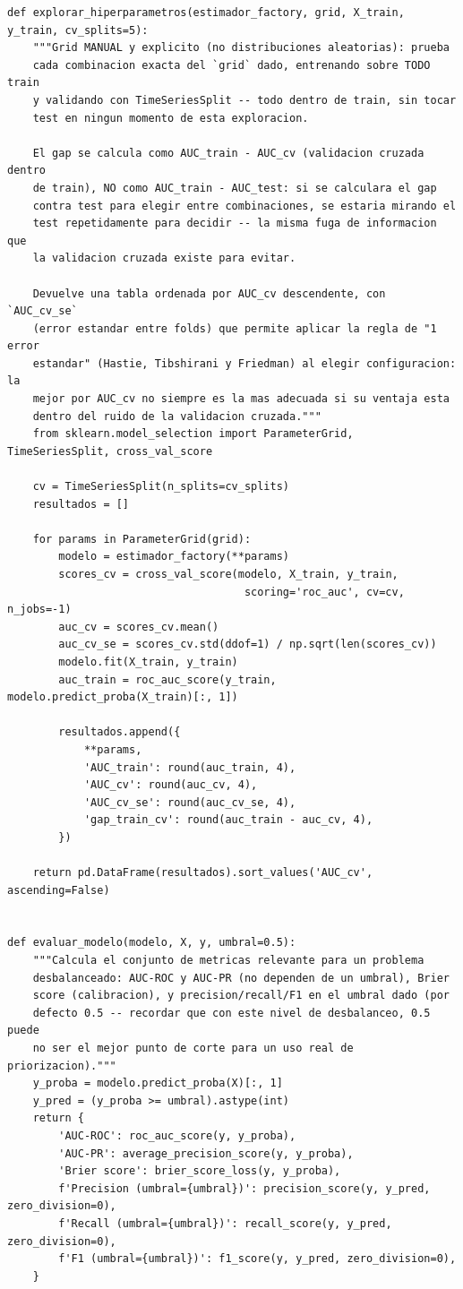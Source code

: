\documentclass[11pt,a4paper]{article}
\begin{document}
\begin{lstlisting}[caption={Exploración manual de una rejilla de hiperparámetros, con validación temporal dentro de entrenamiento.}]
def explorar_hiperparametros(estimador_factory, grid, X_train, y_train, cv_splits=5):
    """Grid MANUAL y explicito (no distribuciones aleatorias): prueba
    cada combinacion exacta del `grid` dado, entrenando sobre TODO train
    y validando con TimeSeriesSplit -- todo dentro de train, sin tocar
    test en ningun momento de esta exploracion.

    El gap se calcula como AUC_train - AUC_cv (validacion cruzada dentro
    de train), NO como AUC_train - AUC_test: si se calculara el gap
    contra test para elegir entre combinaciones, se estaria mirando el
    test repetidamente para decidir -- la misma fuga de informacion que
    la validacion cruzada existe para evitar.

    Devuelve una tabla ordenada por AUC_cv descendente, con `AUC_cv_se`
    (error estandar entre folds) que permite aplicar la regla de "1 error
    estandar" (Hastie, Tibshirani y Friedman) al elegir configuracion: la
    mejor por AUC_cv no siempre es la mas adecuada si su ventaja esta
    dentro del ruido de la validacion cruzada."""
    from sklearn.model_selection import ParameterGrid, TimeSeriesSplit, cross_val_score

    cv = TimeSeriesSplit(n_splits=cv_splits)
    resultados = []

    for params in ParameterGrid(grid):
        modelo = estimador_factory(**params)
        scores_cv = cross_val_score(modelo, X_train, y_train,
                                     scoring='roc_auc', cv=cv, n_jobs=-1)
        auc_cv = scores_cv.mean()
        auc_cv_se = scores_cv.std(ddof=1) / np.sqrt(len(scores_cv))
        modelo.fit(X_train, y_train)
        auc_train = roc_auc_score(y_train, modelo.predict_proba(X_train)[:, 1])

        resultados.append({
            **params,
            'AUC_train': round(auc_train, 4),
            'AUC_cv': round(auc_cv, 4),
            'AUC_cv_se': round(auc_cv_se, 4),
            'gap_train_cv': round(auc_train - auc_cv, 4),
        })

    return pd.DataFrame(resultados).sort_values('AUC_cv', ascending=False)


def evaluar_modelo(modelo, X, y, umbral=0.5):
    """Calcula el conjunto de metricas relevante para un problema
    desbalanceado: AUC-ROC y AUC-PR (no dependen de un umbral), Brier
    score (calibracion), y precision/recall/F1 en el umbral dado (por
    defecto 0.5 -- recordar que con este nivel de desbalanceo, 0.5 puede
    no ser el mejor punto de corte para un uso real de priorizacion)."""
    y_proba = modelo.predict_proba(X)[:, 1]
    y_pred = (y_proba >= umbral).astype(int)
    return {
        'AUC-ROC': roc_auc_score(y, y_proba),
        'AUC-PR': average_precision_score(y, y_proba),
        'Brier score': brier_score_loss(y, y_proba),
        f'Precision (umbral={umbral})': precision_score(y, y_pred, zero_division=0),
        f'Recall (umbral={umbral})': recall_score(y, y_pred, zero_division=0),
        f'F1 (umbral={umbral})': f1_score(y, y_pred, zero_division=0),
    }



\end{lstlisting}
\end{document}
